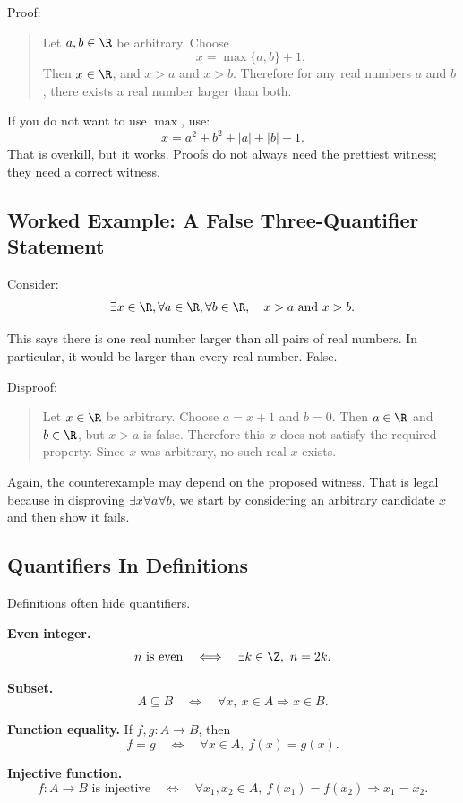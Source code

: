 Proof:

\begin{quote}
Let $a,b\in\R$ be arbitrary. Choose
\[
x=\max\{a,b\}+1.
\]
Then $x\in\R$, and $x>a$ and $x>b$. Therefore for any real numbers $a$ and $b$, there exists a real number larger than both.
\end{quote}

If you do not want to use $\max$, use:
\[
x=a^2+b^2+|a|+|b|+1.
\]
That is overkill, but it works. Proofs do not always need the prettiest witness; they need a correct witness.

\subsection{Worked Example: A False Three-Quantifier Statement}

Consider:
\[
\exists x\in\R,\forall a\in\R,\forall b\in\R,\quad x>a\text{ and }x>b.
\]

This says there is one real number larger than all pairs of real numbers. In particular, it would be larger than every real number. False.

Disproof:

\begin{quote}
Let $x\in\R$ be arbitrary. Choose $a=x+1$ and $b=0$. Then $a\in\R$ and $b\in\R$, but $x>a$ is false. Therefore this $x$ does not satisfy the required property. Since $x$ was arbitrary, no such real $x$ exists.
\end{quote}

Again, the counterexample may depend on the proposed witness. That is legal because in disproving $\exists x\forall a\forall b$, we start by considering an arbitrary candidate $x$ and then show it fails.

\subsection{Quantifiers In Definitions}

Definitions often hide quantifiers.

\textbf{Even integer.}
\[
n\text{ is even}\quad\Longleftrightarrow\quad \exists k\in\Z,\ n=2k.
\]

\textbf{Subset.}
\[
A\subseteq B\quad\Longleftrightarrow\quad \forall x,\ x\in A\Rightarrow x\in B.
\]

\textbf{Function equality.}
If $f,g:A\to B$, then
\[
f=g\quad\Longleftrightarrow\quad \forall x\in A,\ f(x)=g(x).
\]

\textbf{Injective function.}
\[
f:A\to B\text{ is injective}
\quad\Longleftrightarrow\quad
\forall x_1,x_2\in A,\ f(x_1)=f(x_2)\Rightarrow x_1=x_2.
\]

